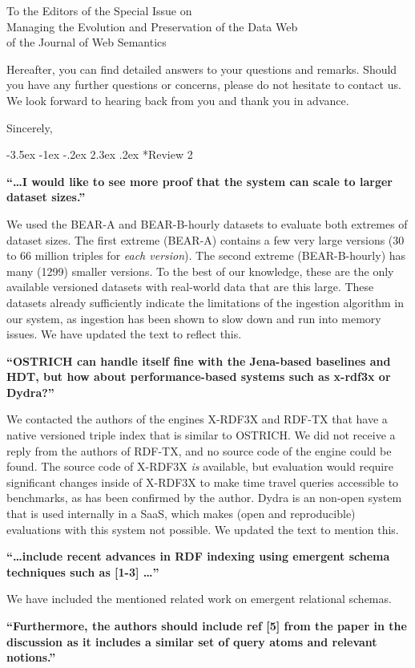 \documentclass{letter}
\makeatletter
\newcounter{section}
\newcommand\section{\@startsection {section}{1}{\z@}%
                                   {-3.5ex \@plus -1ex \@minus -.2ex}%
                                   {2.3ex \@plus.2ex}%
                                   {\normalfont\Large\bfseries}}
\makeatother
\begin{document}
\begin{letter}{To the Editors of the Special Issue on\\Managing the Evolution and Preservation of the Data Web\\of the Journal of Web Semantics}
\clearpage

Hereafter, you can find detailed answers to your questions and remarks.
Should you have any further questions or concerns, please do not hesitate to contact us.
We look forward to hearing back from you and thank you in advance.

\bigskip

\closing{Sincerely,}

\pagebreak
\section*{Review 2}

\textbf{\enquote{\ldots I would like to see more proof that the system can scale to larger dataset sizes.}}

We used the BEAR-A and BEAR-B-hourly datasets to evaluate both extremes of dataset sizes.
The first extreme (BEAR-A) contains a few very large versions (30 to 66 million triples for \emph{each version}).
The second extreme (BEAR-B-hourly) has many (1299) smaller versions.
To the best of our knowledge, these are the only available versioned datasets with real-world data
that are this large.
These datasets already sufficiently indicate the limitations of the ingestion algorithm in our system,
as ingestion has been shown to slow down and run into memory issues.
We have updated the text to reflect this.

\textbf{\enquote{OSTRICH can handle itself fine with the Jena-based baselines and HDT, but how about performance-based systems such as x-rdf3x or Dydra?}}

We contacted the authors of the engines X-RDF3X and RDF-TX that have a native versioned triple index that is similar to OSTRICH.
We did not receive a reply from the authors of RDF-TX, and no source code of the engine could be found.
The source code of X-RDF3X \emph{is} available, but evaluation would require significant changes inside of X-RDF3X
to make time travel queries accessible to benchmarks, as has been confirmed by the author.
Dydra is an non-open system that is used internally in a SaaS, which makes (open and reproducible) evaluations with this system not possible.
We updated the text to mention this.

\textbf{\enquote{\ldots include recent advances in RDF indexing using emergent schema techniques such as [1-3] \ldots}}

We have included the mentioned related work on emergent relational schemas.

\textbf{\enquote{Furthermore, the authors should include ref [5] from the paper in the discussion as it includes a similar set of query atoms and relevant notions.}}


\end{letter}
\end{document}

